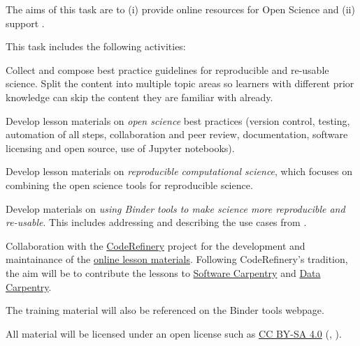 \begin{task}[
  title=Best practice guidelines for reproducible science,
  id=online-resources,
  lead=UIO,
  PM=10,
  wphases={0-36!.28},
  partners={SRL,MP,UIO}
]
  The aims of this task are to (i) provide online resources for Open Science and
  (ii) support .
  
  This task includes the following activities:
  \begin{compactitem}
  \item Collect and compose best practice guidelines for reproducible and
    re-usable science. Split the content into multiple topic areas so learners
    with different prior knowledge can skip the content they are familiar with
    already.
  \item Develop lesson materials on \emph{open science} best practices (version
    control, testing, automation of all steps, collaboration and peer review,
    documentation, software licensing and open source, use of Jupyter
    notebooks).
  \item Develop lesson materials on \emph{reproducible computational science},
    which focuses on combining the open science tools for reproducible science.
  \item Develop materials on \emph{using Binder tools to make science more
      reproducible and re-usable}. This includes addressing and describing the
    use cases from .
  \item Collaboration with the \href{https://coderefinery.org}{CodeRefinery}
    project for the development and maintainance of the
    \href{https://coderefinery.org/lessons/}{online lesson materials}. Following
    CodeRefinery's tradition, the aim will be to contribute the lessons to
    \href{https://software-carpentry.org/}{Software Carpentry} and
    \href{https://data-carpentry.org/}{Data Carpentry}.
  \item The training material will also be referenced on the Binder tools webpage.
  \end{compactitem}
  All material will be licensed under an open license such as
  \href{https://creativecommons.org/licenses/by-sa/4.0/}{CC BY-SA 4.0}
  (, ).
\end{task}
